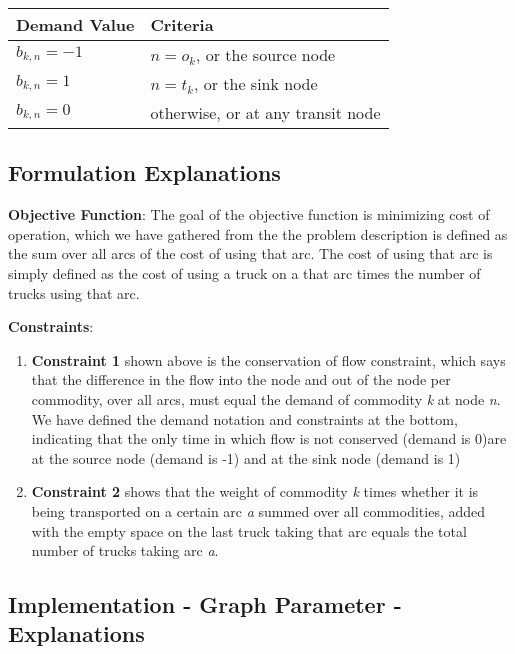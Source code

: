 \documentclass[
]{article}
\providecommand{\tightlist}{%
  \setlength{\itemsep}{0pt}\setlength{\parskip}{0pt}}
\begin{document}
\begin{longtable}[]{@{}ll@{}}
\toprule
\textbf{Demand Value} & \textbf{Criteria}\tabularnewline
\midrule
\endhead
\(b_{k,n} = -1\) & \(n=o_k\), or the source node\tabularnewline
\(b_{k,n} = 1\) & \(n=t_k\), or the sink node\tabularnewline
\(b_{k,n}= 0\) & otherwise, or at any transit node\tabularnewline
\bottomrule
\end{longtable}

\hypertarget{formulation-explanations}{%
\subsection{Formulation Explanations}\label{formulation-explanations}}

\textbf{Objective Function}: The goal of the objective function is
minimizing cost of operation, which we have gathered from the the
problem description is defined as the sum over all arcs of the cost of
using that arc. The cost of using that arc is simply defined as the cost
of using a truck on a that arc times the number of trucks using that
arc.

\textbf{Constraints}:

\begin{enumerate}
\def\labelenumi{\arabic{enumi}.}
\tightlist
\item
  \textbf{Constraint 1} shown above is the conservation of flow
  constraint, which says that the difference in the flow into the node
  and out of the node per commodity, over all arcs, must equal the
  demand of commodity \emph{k} at node \emph{n}. We have defined the
  demand notation and constraints at the bottom, indicating that the
  only time in which flow is not conserved (demand is 0)are at the
  source node (demand is -1) and at the sink node (demand is 1)
\item
  \textbf{Constraint 2} shows that the weight of commodity \emph{k}
  times whether it is being transported on a certain arc \emph{a} summed
  over all commodities, added with the empty space on the last truck
  taking that arc equals the total number of trucks taking arc \emph{a}.
\end{enumerate}

\hypertarget{implementation---graph-parameter---explanations}{%
\subsection{Implementation - Graph Parameter -
Explanations}\label{implementation---graph-parameter---explanations}}
\end{document}

